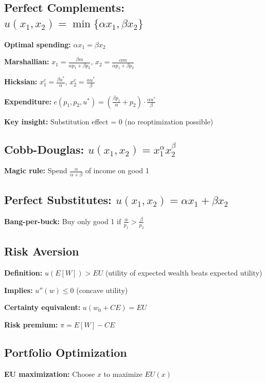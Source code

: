 \documentclass[11pt]{article}
\begin{document}
\subsection*{Perfect Complements: $u(x_1, x_2) = \min\{\alpha x_1, \beta x_2\}$}

\textbf{Optimal spending:} $\alpha x_1 = \beta x_2$

\textbf{Marshallian:} $x_1 = \frac{\beta m}{\alpha p_1 + \beta p_2}$, $x_2 = \frac{\alpha m}{\alpha p_1 + \beta p_2}$

\textbf{Hicksian:} $x_1^c = \frac{\beta u^*}{\alpha}$, $x_2^c = \frac{\alpha u^*}{\beta}$

\textbf{Expenditure:} $e(p_1, p_2, u^*) = \left(\frac{\beta p_1}{\alpha} + p_2\right) \cdot \frac{\alpha u^*}{\beta}$

\textbf{Key insight:} Substitution effect = 0 (no reoptimization possible)

\subsection*{Cobb-Douglas: $u(x_1, x_2) = x_1^\alpha x_2^\beta$}

\textbf{Magic rule:} Spend $\frac{\alpha}{\alpha + \beta}$ of income on good 1

\subsection*{Perfect Substitutes: $u(x_1, x_2) = \alpha x_1 + \beta x_2$}

\textbf{Bang-per-buck:} Buy only good 1 if $\frac{\alpha}{p_1} > \frac{\beta}{p_2}$

\subsection*{Risk Aversion}

\textbf{Definition:} $u(E[W]) > EU$ (utility of expected wealth beats expected utility)

\textbf{Implies:} $u''(w) \leq 0$ (concave utility)

\textbf{Certainty equivalent:} $u(w_0 + CE) = EU$

\textbf{Risk premium:} $\pi = E[W] - CE$

\subsection*{Portfolio Optimization}

\textbf{EU maximization:} Choose $x$ to maximize $EU(x)$
\end{document}
